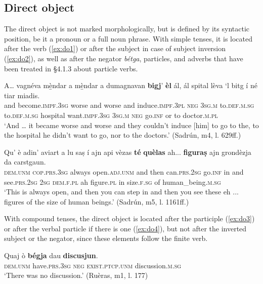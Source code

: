 \subsection{Direct object}
The direct object is not marked morphologically, but is defined by its syntactic position, be it a pronoun or a full noun phrase. With simple tenses, it is located after the verb (\ref{ex:do1}) or after the subject in case of subject inversion (\ref{ex:do2}), as well as after the negator \textit{bétga}, particles, and adverbs that have been treated in §4.1.3 about particle verbs.

\ea
\label{ex:do1}
\gll  A… vagnéva mè̱ndar a mè̱ndar a dumagnavan \textbf{bigj}' {\ob}\textbf{èl}{\cb} ál, ál spital lèva  `l bitg í né tiar miadis.  \\
and become.\textsc{impf.3sg} worse and worse and induce.\textsc{impf.3pl} \textsc{neg} \textsc{3sg.m} to.\textsc{def.m.sg} to.\textsc{def.m.sg} hospital want.\textsc{impf.3sg} \textsc{3sg.m} \textsc{neg} go.\textsc{inf} or to doctor.\textsc{m.pl} \\
\glt `And … it became worse and worse and they couldn’t induce [him] to go to the, to the hospital he didn’t want to go, nor to the doctors.' (Sadrún, m4, l. 629ff.)
\z

\ea\label{ex:do2}
\gll  Qu’ è adin' aviart a lu saṣ í ajn api vèzas {\ob}\textbf{té}{\cb} {\ob}\textbf{quèlas} ah... \textbf{figuraṣ}{\cb} ajn grondèzja da carstgaun.\\
\textsc{dem.unm} \textsc{cop.prs.3sg} always open.\textsc{adj.unm} and then can.\textsc{prs.2sg} go.\textsc{inf} in and see.\textsc{prs.2sg} \textsc{2sg} \textsc{dem.f.pl} ah figure.\textsc{pl} in size.\textsc{f.sg} of human\_being.\textsc{m.sg} \\
\glt `This is always open, and then you can step in and then you see these eh ... figures of the size of human beings.' (Sadrún, m5, l. 1161ff.)
\z

With compound tenses, the direct object is located after the participle (\ref{ex:do3}) or after the verbal particle if there is one (\ref{ex:do4}), but not after the inverted subject or the negator, since these elements follow the finite verb.

\ea\label{ex:do3}
\gll    Quaj ò \textbf{bégja} dau {\ob}\textbf{discusjun}{\cb}.\\
\textsc{dem.unm} have.\textsc{prs.3sg} \textsc{neg} \textsc{exist.ptcp.unm} discussion.\textsc{m.sg}\\
\glt `There was no discussion.' (Ruèras, m1, l. 177)
\z

